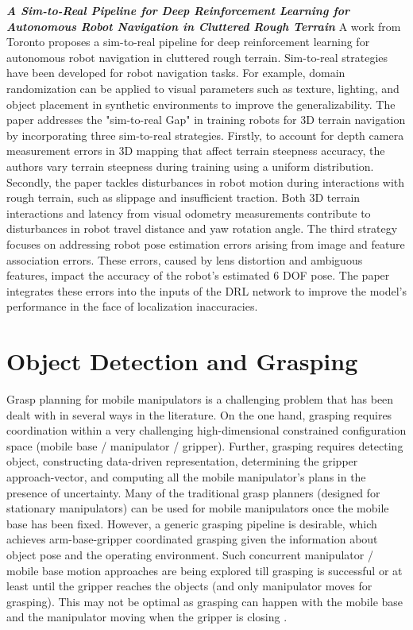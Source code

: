 \textbf{\textit{A Sim-to-Real Pipeline for Deep Reinforcement
		Learning for Autonomous Robot Navigation in
		Cluttered Rough Terrain}} \quad
A work from Toronto \cite{zhang2021simtoreal} proposes a sim-to-real pipeline for
deep reinforcement learning for autonomous robot navigation in cluttered rough terrain.
Sim-to-real strategies have been developed for robot navigation tasks. For example,
domain randomization can be applied to visual parameters such as texture,
lighting, and object placement in synthetic environments to improve the generalizability.
The paper \cite{zhang2021simtoreal} addresses the "sim-to-real Gap" in training robots for
3D terrain navigation by incorporating three sim-to-real strategies. Firstly, to account
for depth camera measurement errors in 3D mapping that affect terrain steepness accuracy,
the authors vary terrain steepness during training using a uniform distribution.
Secondly, the paper tackles disturbances in robot motion during interactions with rough
terrain, such as slippage and insufficient traction. Both 3D terrain interactions and
latency from visual odometry measurements contribute to disturbances in robot travel distance
and yaw rotation angle. The third strategy focuses on addressing robot pose estimation errors
arising from image and feature association errors. These errors, caused by lens distortion
and ambiguous features, impact the accuracy of the robot's estimated 6 DOF pose.
The paper integrates these errors into the inputs of the DRL network to improve the
model's performance in the face of localization inaccuracies.



\section{Object Detection and Grasping}

Grasp planning for mobile manipulators is a challenging problem that has been
dealt with in several ways in the literature. On the one hand, grasping requires coordination
within a very challenging high-dimensional constrained configuration space (mobile base /
manipulator / gripper). Further, grasping requires detecting object, constructing data-driven
representation, determining the gripper approach-vector, and computing all the mobile manipulator's
plans in the presence of uncertainty. Many of the traditional grasp planners (designed for stationary
manipulators) can be used for mobile manipulators once the mobile base has been fixed.
However, a generic grasping pipeline is desirable, which achieves arm-base-gripper
coordinated grasping given the information about object pose and
the operating environment. Such concurrent manipulator / mobile base motion approaches are being
explored till grasping is successful or at least until the gripper reaches the
objects (and only manipulator moves for grasping). This may not be optimal as grasping can happen
with the mobile base and the manipulator moving when the gripper is closing \cite{thakar2023survey}.

